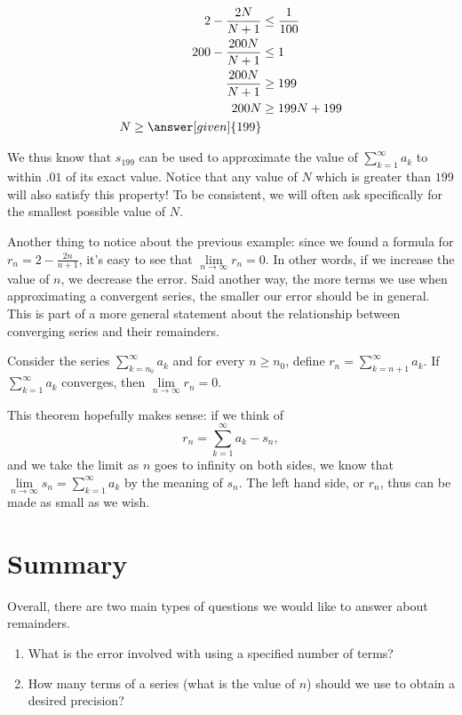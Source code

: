 \documentclass{ximera}
\begin{document}
\begin{example}
\begin{explanation}
\begin{enumerate}
\begin{align*}
2-\frac{2N}{N+1} &\leq \frac{1}{100} \\
200-\frac{200N}{N+1} & \leq 1 \\
\frac{200N}{N+1} & \geq 199 \\
200N & \geq 199N+199 \\
N \geq \answer[given]{199}
\end{align*}

We thus know that $s_{199}$ can be used to approximate the value of $\sum_{k=1}^{\infty} a_k$ to within $.01$ of its exact value.  Notice that any value of $N$ which is greater than $199$ will also satisfy this property!  To be consistent, we will often ask specifically for the smallest possible value of $N$.
\end{enumerate}
\end{explanation}

\end{example}

Another thing to notice about the previous example: since we found a formula for $r_n = 2 - \frac{2n}{n+1}$, it's easy to see that $\lim \limits_{n \to \infty} r_n = 0$. In other words, if we increase the value of $n$, we decrease the error.  Said another way, the more terms we use when approximating a convergent series, the smaller our error should be in general.  This is part of a more general statement about the relationship between converging series and their remainders.

\begin{theorem}
Consider the series $\sum_{k=n_0}^{\infty} a_k$ and for every $n \geq n_0$, define $r_n = \sum_{k=n+1}^{\infty} a_k$.  If $\sum \limits_{k=1}^\infty a_k$ converges, then $\lim \limits_{n \to \infty} r_n = 0$.   
\end{theorem}

This theorem hopefully makes sense: if we think of 
\[
r_n = \sum \limits_{k=1}^\infty a_k - s_n,
\]
and we take the limit as $n$ goes to infinity on both sides, we know that $\lim \limits_{n \to \infty} s_n = \sum \limits_{k=1}^\infty a_k$ by the meaning of $s_n$.  The left hand side, or $r_n$, thus can be made as small as we wish.

\section{Summary}
Overall, there are two main types of questions we would like to answer about remainders.
\begin{enumerate}
    \item What is the error involved with using a specified number of terms?
    \item How many terms of a series (what is the value of $n$) should we use to obtain a desired precision?
\end{enumerate}
\end{document}
